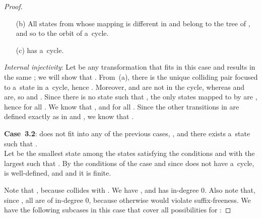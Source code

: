 \documentclass{amsart}
\begin{document}
\begin{proof}
\begin{enumerate}
\item[(b)] All states from  whose mapping is different in  and  belong to the tree of , and so to the orbit of a~cycle.

\item[(c)]  has a~cycle.
\end{enumerate}

\textit{Internal injectivity}:
Let  be any transformation that fits in this case and results in the same ; we will show that .
From~(a), there is the unique colliding pair  focused to a~state in a~cycle, hence .
Moreover,  and  are not in the cycle, whereas  and  are, so  and .
Since there is no state  such that , the only states mapped to  by  are , hence  for all .
We know that , and  for all .
Since the other transitions in  are defined exactly as in  and , we know that .

\textbf{Case~3.2}:  does not fit into any of the previous cases, , and there exists a~state  such that .\\
Let  be the smallest state among the states satisfying the conditions and with the largest  such that .
By the conditions of the case and since  does not have a~cycle,  is well-defined, and  and it is finite.

Note that , because  collides with .
We have , and  has in-degree 0.
Also note that, since , all  are of in-degree 0, because otherwise  would violate suffix-freeness.
We have the following subcases in this case that cover all possibilities for :


\end{proof}
\end{document}
